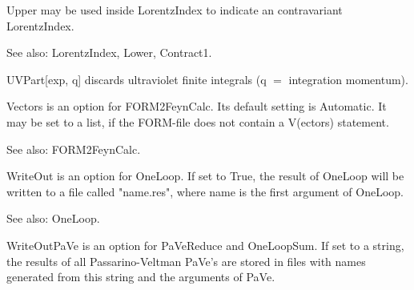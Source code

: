 \dispSFoutmath{
\{ \}
}









Upper may be used inside LorentzIndex to indicate an contravariant LorentzIndex.

See also: { }LorentzIndex, Lower, Contract1.



UVPart[exp, q] discards ultraviolet finite integrals { }(q \(=\) integration momentum).





Vectors is an option for FORM2FeynCalc. Its default setting is Automatic. It may be set to a list, if the FORM-file does not contain a
  V(ectors) statement.

See also: { }FORM2FeynCalc.



WriteOut is an option for OneLoop. { }If set to True, the result of OneLoop will be written to a file called "name.res", where name is
  the first argument of OneLoop.

See also: { }OneLoop.



WriteOutPaVe is an option for PaVeReduce and OneLoopSum. If set to a string, the results of all Passarino-Veltman PaVe's are stored in
  files with names generated from this string and the arguments of PaVe.

